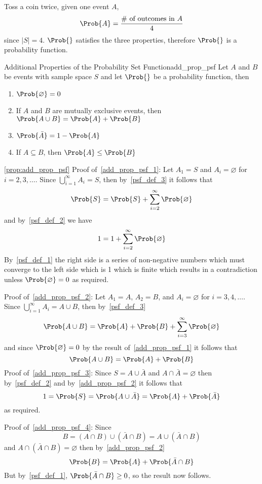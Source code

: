 \begin{Example}{}{}
    Toss a coin twice, given one event $ A $,
    \[ \Prob{A}=\frac{\text{\# of outcomes in }A}{4}  \]
    since $ |S|= 4 $. $ \Prob{} $ satisfies the three properties,
    therefore $ \Prob{} $ is a probability function.
\end{Example}

\begin{Proposition}{Additional Properties of the Probability Set Function}{add_prop_psf}
    Let $ A $ and $ B $ be events with sample space $ S $
    and let $ \Prob{} $ be a probability function, then
    \begin{enumerate}[label=(\arabic*)]
        \item\label{add_prop_psf_1} $ \Prob{\varnothing}=0 $
        \item\label{add_prop_psf_2} If $ A $ and $ B $ are mutually exclusive events, then $ \Prob{A\cup B}=\Prob{A}+\Prob{B} $
        \item\label{add_prop_psf_3} $ \Prob{\bar{A}}=1-\Prob{A} $
        \item\label{add_prop_psf_4} If $ A\subseteq B $, then $ \Prob{A}\le \Prob{B} $
    \end{enumerate}
\end{Proposition}
\begin{Proof}{\ref{prop:add_prop_psf}}{}
    Proof of~\ref{add_prop_psf_1}: Let $ A_1=S $ and $ A_i=\varnothing $ for $ i=2,3,\ldots $.
    Since $ \bigcup\limits_{i=1}^{\infty}A_i=S $, then by~\ref{psf_def_3}
    it follows that
    \[ \Prob{S}=\Prob{S}+\sum\limits_{i=2}^{\infty} \Prob{\varnothing} \]
    and by~\ref{psf_def_2} we have
    \[ 1=1+\sum\limits_{i=2}^{\infty}\Prob{\varnothing} \]
    By~\ref{psf_def_1} the right side is a series of non-negative numbers which must converge to
    the left side which is 1 which is finite which results in a contradiction
    unless $ \Prob{\varnothing}=0 $ as required.

    Proof of~\ref{add_prop_psf_2}: Let $ A_1=A $, $ A_2=B $, and $ A_i=\varnothing $ for
    $ i=3,4,\ldots $. Since $ \bigcup\limits_{i=1}^\infty A_i=A\cup B $, then by~\ref{psf_def_3}
    \[ \Prob{A\cup B}=\Prob{A}+\Prob{B}+\sum\limits_{i=3}^{\infty} \Prob{\varnothing} \]
    and since $ \Prob{\varnothing}=0 $ by the result of~\ref{add_prop_psf_1} it follows that
    \[ \Prob{A\cup B}=\Prob{A}+\Prob{B} \]
    Proof of~\ref{add_prop_psf_3}: Since $ S=A\cup \bar{A} $ and $ A\cap \bar{A}=\varnothing $
    then by~\ref{psf_def_2} and by~\ref{add_prop_psf_2} it follows that
    \[ 1=\Prob{S}=\Prob{A\cup\bar{A}}=\Prob{A}+\Prob{\bar{A}} \]
    as required.

    Proof of~\ref{add_prop_psf_4}: Since
    \[ B=(A\cap B)\cup (\bar{A}\cap B)=A\cup(\bar{A}\cap B) \]
    and $ A\cap(\bar{A}\cap B)=\varnothing $ then by~\ref{add_prop_psf_2}
    \[ \Prob{B}=\Prob{A}+\Prob{\bar{A}\cap B} \]
    But by~\ref{psf_def_1}, $ \Prob{\bar{A}\cap B}\ge 0 $, so the result now follows.
\end{Proof}

